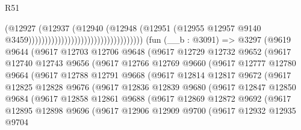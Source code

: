 \begin{lexlean}{R51}
\begin{coremodule}
                                                              (@12927
                                                                (@12937
                                                                  (@12940
                                                                    (@12948
                                                                      (@12951
                                                                        (@12955
                                                                          @12957
                                                                          @9140
                                                                          @3459)))))))))))))))))))))))))))))))))))
    (fun (__b : @3091) =>
    @3297
      (@9619
        @9644
        (@9617
          @12703
          @12706
          @9648
          (@9617
            @12729
            @12732
            @9652
            (@9617
              @12740
              @12743
              @9656
              (@9617
                @12766
                @12769
                @9660
                (@9617
                  @12777
                  @12780
                  @9664
                  (@9617
                    @12788
                    @12791
                    @9668
                    (@9617
                      @12814
                      @12817
                      @9672
                      (@9617
                        @12825
                        @12828
                        @9676
                        (@9617
                          @12836
                          @12839
                          @9680
                          (@9617
                            @12847
                            @12850
                            @9684
                            (@9617
                              @12858
                              @12861
                              @9688
                              (@9617
                                @12869
                                @12872
                                @9692
                                (@9617
                                  @12895
                                  @12898
                                  @9696
                                  (@9617
                                    @12906
                                    @12909
                                    @9700
                                    (@9617
                                      @12932
                                      @12935
                                      @9704

\end{coremodule}
\end{lexlean}

